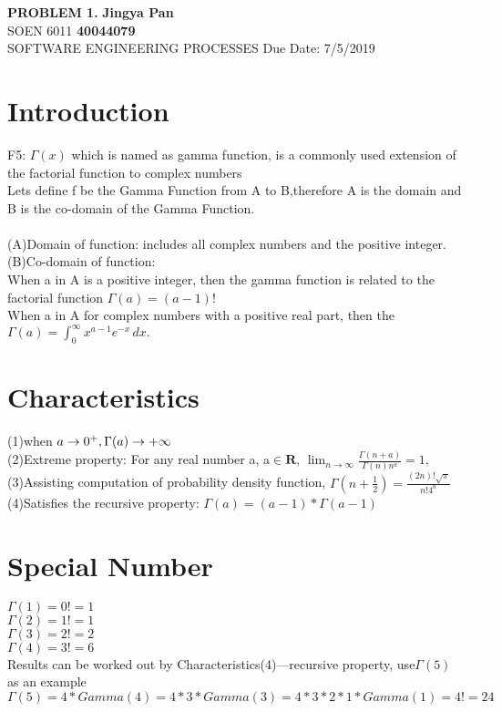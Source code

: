 \documentclass[a4paper, 11pt]{article}
\begin{document}
\noindent
\large\textbf{PROBLEM 1.} \hfill \textbf{Jingya Pan} \\
\normalsize SOEN 6011 \hfill \textbf{40044079} \\
 SOFTWARE ENGINEERING PROCESSES \hfill Due Date: 7/5/2019 \\


\section{Introduction}

F5: $\Gamma \left( x \right)$ which is named as gamma function, is a commonly used extension of the factorial function to complex numbers\\

Lets define f be the Gamma Function from A to B,therefore A is the domain and B is the  co-domain of the Gamma Function.\\ \\
\indent(A)Domain of function: includes all complex numbers and the positive integer.\\

(B)Co-domain of function: \\
\indent\indent\indent When a in A is a positive integer, then the gamma function is related to the factorial function  $\Gamma(a) = (a-1)!$ \\
\indent\indent\indent When a in A for complex numbers with a positive real part, then the ${\displaystyle \Gamma (a)=\int _{0}^{\infty }x^{a-1}e^{-x}\,dx.}$

\section{Characteristics}
\indent\indent (1)when ${\displaystyle} a\to 0^+, {\displaystyle} \Gamma(a)\to+\infty$ \\

\indent (2)Extreme property: For any real number a,  a$\in\mathbf{R}$, $\lim_{n\to\infty} \frac{\Gamma(n+a)}{\Gamma(n)n^{a}} = 1, $ \\

\indent (3)Assisting computation of probability density function, ${\displaystyle \Gamma \left(n+{\tfrac {1}{2}}\right)={\frac {(2n)!{\sqrt {\pi }}}{n!4^{n}}}}$ \\

\indent(4)Satisfies the recursive property: $\Gamma(a)=(a-1)*\Gamma(a-1)$

\section{Special Number}
\indent\indent $\Gamma(1) = 0! = 1$\\
\indent $\Gamma(2) = 1! = 1$ \\
\indent $\Gamma(3) = 2! = 2$ \\
\indent $\Gamma(4) = 3! = 6$ \\
\indent Results can be worked out by Characteristics(4)---recursive property, use$\Gamma(5)$ as an example \\
\indent $\Gamma(5)=4*Gamma(4)=4*3*Gamma(3)=4*3*2*1*Gamma(1)=4!=24$
\end{document}
